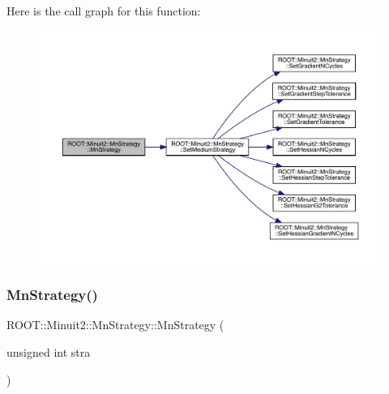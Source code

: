 Here is the call graph for this function\+:\nopagebreak
\begin{figure}[H]
\begin{center}
\leavevmode
\includegraphics[width=350pt]{da/de4/classROOT_1_1Minuit2_1_1MnStrategy_a231337ee8aec47874370bc4b64683374_cgraph}
\end{center}
\end{figure}
\mbox{\label{classROOT_1_1Minuit2_1_1MnStrategy_ad70367966dc3b7cdf1be671acb3824d0}} 
\subsubsection{\texorpdfstring{MnStrategy()}{MnStrategy()}\hspace{0.1cm}{\footnotesize\ttfamily [2/4]}}
{\footnotesize\ttfamily R\+O\+O\+T\+::\+Minuit2\+::\+Mn\+Strategy\+::\+Mn\+Strategy (\begin{DoxyParamCaption}\item[{unsigned int}]{stra }\end{DoxyParamCaption})\hspace{0.3cm}{\ttfamily [explicit]}}


